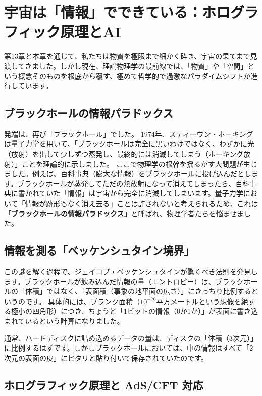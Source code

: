 \section{宇宙は「情報」でできている：ホログラフィック原理とAI}

第13章と本章を通じて、私たちは物質を極限まで細かく砕き、宇宙の果てまで見渡してきました。しかし現在、理論物理学の最前線では、「物質」や「空間」という概念そのものを根底から覆す、極めて哲学的で過激なパラダイムシフトが進行しています。

\subsection{ブラックホールの情報パラドックス}

発端は、再び「ブラックホール」でした。 1974年、スティーヴン・ホーキングは量子力学を用いて、「ブラックホールは完全に黒いわけではなく、わずかに光（放射）を出して少しずつ蒸発し、最終的には消滅してしまう（ホーキング放射）」ことを理論的に示しました。 ここで物理学の根幹を揺るがす大問題が生じました。例えば、百科事典（膨大な情報）をブラックホールに投げ込んだとします。ブラックホールが蒸発してただの熱放射になって消えてしまったら、百科事典に書かれていた「情報」は宇宙から完全に消滅してしまいます。量子力学において「情報が跡形もなく消え去る」ことは許されないと考えられるため、これは\textbf{「ブラックホールの情報パラドックス」}と呼ばれ、物理学者たちを悩ませました。

\subsection{情報を測る「ベッケンシュタイン境界」}

この謎を解く過程で、ジェイコブ・ベッケンシュタインが驚くべき法則を発見します。ブラックホールが飲み込んだ情報の量（エントロピー）は、ブラックホールの「体積」ではなく、「表面積（事象の地平面の広さ）」にきっちり比例するというのです。 具体的には、プランク面積（\(10^{-70}\)平方メートルという想像を絶する極小の四角形）につき、ちょうど「1ビットの情報（0か1か）」が表面に書き込まれているという計算になりました。

通常、ハードディスクに詰め込めるデータの量は、ディスクの「体積（3次元）」に比例するはずです。しかしブラックホールにおいては、中の情報はすべて「2次元の表面の皮」にピタリと貼り付いて保存されていたのです。

\subsection{ホログラフィック原理と AdS/CFT 対応}

